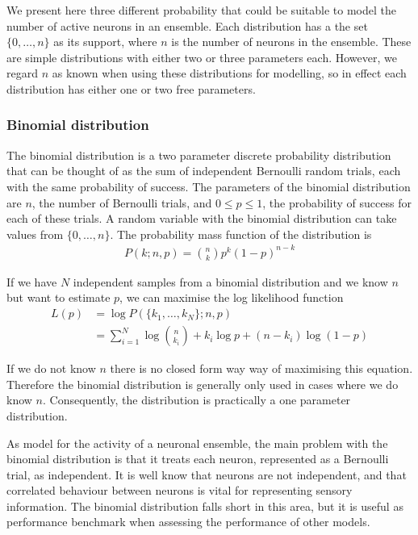 \documentclass[a4paper,12pt]{article}
\theoremstyle{definition}
\begin{document}
    We present here three different probability that could be suitable to model the number of active neurons in an ensemble. Each distribution has a the set $\lbrace 0, \dots, n \rbrace$ as its support, where $n$ is the number of neurons in the ensemble. These are simple distributions with either two or three parameters each. However, we regard $n$ as known when using these distributions for modelling, so in effect each distribution has either one or two free parameters.

      \subsubsection{Binomial distribution}
      The binomial distribution is a two parameter discrete probability distribution that can be thought of as the sum of independent Bernoulli random trials, each with the same probability of success. The parameters of the binomial distribution are  $n$, the number of Bernoulli trials, and $0 \leq p \leq 1$, the probability of success for each of these trials. A random variable with the binomial distribution can take values from $\lbrace 0, \dots, n \rbrace$. The probability mass function of the distribution is
      \begin{align}\label{eq:binomial_pmf}
        P(k;n,p) = \binom{n}{k} p^k (1-p)^{n-k}
      \end{align}

      If we have $N$ independent samples from a binomial distribution and we know $n$ but want to estimate $p$, we can maximise the log likelihood function
      \begin{align}\label{eq:binomial_log_like}
        L(p) & = \log P(\lbrace k_1, \dots, k_N \rbrace; n,p) \\ 
            & = \sum_{i=1}^N \log \binom{n}{k_i} + k_i \log p + (n-k_i)\log(1-p) 
      \end{align}

      If we do not know $n$ there is no closed form way way of maximising this equation. Therefore the binomial distribution is generally only used in cases where we do know $n$. Consequently, the distribution is practically a one parameter distribution.

      As model for the activity of a neuronal ensemble, the main problem with the binomial distribution is that it treats each neuron, represented as a Bernoulli trial, as independent. It is well know that neurons are not independent, and that correlated behaviour between neurons is vital for representing sensory information. The binomial distribution falls short in this area, but it is useful as performance benchmark when  assessing the performance of other models.
\end{document}
